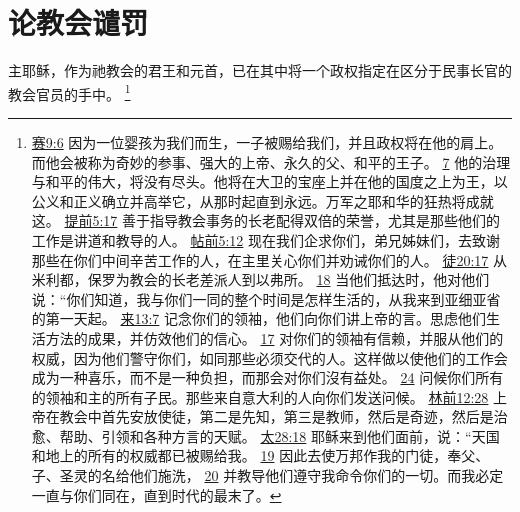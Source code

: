 \documentclass[12pt, a4paper, oneside]{ctexart}
\newcounter{parnum}[section]
\newcommand{\N}{%
   \noindent\refstepcounter{parnum}%
    \makebox[\parindent][l]{\textbf{\arabic{parnum}.}}}
\begin{document}
\section{论教会谴罚}

\N 主耶稣，作为祂教会的君王和元首，已在其中将一个政权指定在区分于民事长官的教会官员的手中。
	\footnote {
		\href{https://biblehub.com/isaiah/9-6.htm}{赛9:6} 因为一位婴孩为我们而生，一子被赐给我们，并且政权将在他的肩上。而他会被称为奇妙的参事、强大的上帝、永久的父、和平的王子。
		\href{https://biblehub.com/isaiah/9-7.htm}{7} 他的治理与和平的伟大，将没有尽头。他将在大卫的宝座上并在他的国度之上为王，以公义和正义确立并高举它，从那时起直到永远。万军之耶和华的狂热将成就这。
		\href{https://biblehub.com/1_timothy/5-17.htm}{提前5:17} 善于指导教会事务的长老配得双倍的荣誉，尤其是那些他们的工作是讲道和教导的人。
		\href{https://biblehub.com/1_thessalonians/5-12.htm}{帖前5:12} 现在我们企求你们，弟兄姊妹们，去致谢那些在你们中间辛苦工作的人，在主里关心你们并劝诫你们的人。
		\href{https://biblehub.com/acts/20-17.htm}{徒20:17} 从米利都，保罗为教会的长老差派人到以弗所。
		\href{https://biblehub.com/acts/20-18.htm}{18} 当他们抵达时，他对他们说：“你们知道，我与你们一同的整个时间是怎样生活的，从我来到亚细亚省的第一天起。
		\href{https://biblehub.com/hebrews/13-7.htm}{来13:7} 记念你们的领袖，他们向你们讲上帝的言。思虑他们生活方法的成果，并仿效他们的信心。
		\href{https://biblehub.com/hebrews/13-17.htm}{17} 对你们的领袖有信赖，并服从他们的权威，因为他们警守你们，如同那些必须交代的人。这样做以使他们的工作会成为一种喜乐，而不是一种负担，而那会对你们沒有益处。
		\href{https://biblehub.com/hebrews/13-24.htm}{24} 问候你们所有的领袖和主的所有子民。那些来自意大利的人向你们发送问候。
		\href{https://biblehub.com/1_corinthians/12-28.htm}{林前12:28} 上帝在教会中首先安放使徒，第二是先知，第三是教师，然后是奇迹，然后是治愈、帮助、引领和各种方言的天赋。
		\href{https://biblehub.com/matthew/28-18.htm}{太28:18} 耶稣来到他们面前，说：“天国和地上的所有的权威都已被赐给我。
		\href{https://biblehub.com/matthew/28-19.htm}{19} 因此去使万邦作我的门徒，奉父、子、圣灵的名给他们施洗，
		\href{https://biblehub.com/matthew/28-20.htm}{20} 并教导他们遵守我命令你们的一切。而我必定一直与你们同在，直到时代的最末了。
	}
\end{document}
